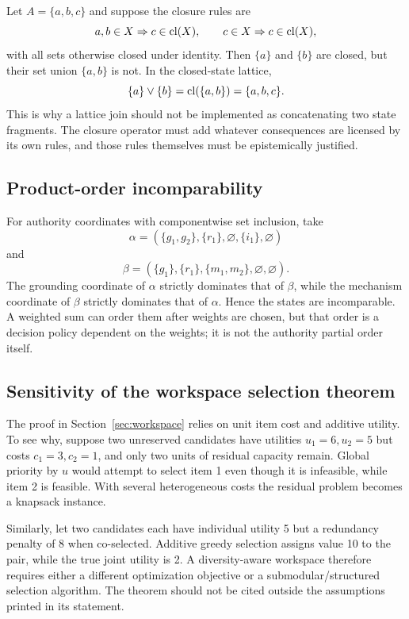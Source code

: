 Let \(A=\{a,b,c\}\) and suppose the closure rules are
\[
a,b\in X\Rightarrow c\in\operatorname{cl}(X),
\qquad c\in X\Rightarrow c\in\operatorname{cl}(X),
\]
with all sets otherwise closed under identity. Then \(\{a\}\) and \(\{b\}\) are closed, but their set union \(\{a,b\}\) is not. In the closed-state lattice,
\[
\{a\}\vee\{b\}
=\operatorname{cl}(\{a,b\})
=\{a,b,c\}.
\]
This is why a lattice join should not be implemented as concatenating two state fragments. The closure operator must add whatever consequences are licensed by its own rules, and those rules themselves must be epistemically justified.

\subsection{Product-order incomparability}

For authority coordinates with componentwise set inclusion, take
\[
\alpha=(\{g_1,g_2\},\{r_1\},\varnothing,\{i_1\},\varnothing)
\]
and
\[
\beta=(\{g_1\},\{r_1\},\{m_1,m_2\},\varnothing,\varnothing).
\]
The grounding coordinate of \(\alpha\) strictly dominates that of \(\beta\), while the mechanism coordinate of \(\beta\) strictly dominates that of \(\alpha\). Hence the states are incomparable. A weighted sum can order them after weights are chosen, but that order is a decision policy dependent on the weights; it is not the authority partial order itself.

\subsection{Sensitivity of the workspace selection theorem}

The proof in Section~\ref{sec:workspace} relies on unit item cost and additive utility. To see why, suppose two unreserved candidates have utilities \(u_1=6,u_2=5\) but costs \(c_1=3,c_2=1\), and only two units of residual capacity remain. Global priority by \(u\) would attempt to select item 1 even though it is infeasible, while item 2 is feasible. With several heterogeneous costs the residual problem becomes a knapsack instance.

Similarly, let two candidates each have individual utility 5 but a redundancy penalty of 8 when co-selected. Additive greedy selection assigns value 10 to the pair, while the true joint utility is 2. A diversity-aware workspace therefore requires either a different optimization objective or a submodular/structured selection algorithm. The theorem should not be cited outside the assumptions printed in its statement.

